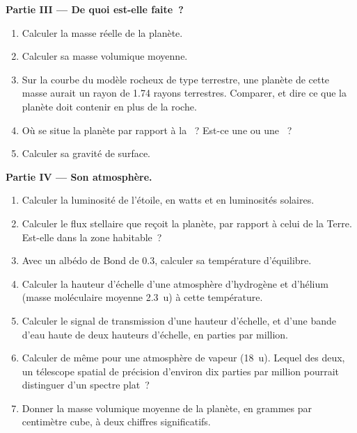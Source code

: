 \begin{problem}
\medskip\noindent\textbf{Partie III --- De quoi est-elle faite~?}
\begin{enumerate}[resume]
\item Calculer la masse réelle de la planète.
\item Calculer sa masse volumique moyenne.
\item Sur la courbe du modèle rocheux de type terrestre, une planète de cette masse
  aurait un rayon de 1.74 rayons terrestres. Comparer, et dire ce que la planète
  doit contenir en plus de la roche.
\item Où se situe la planète par rapport à la ~? Est-ce
  une  ou une ~?
\item Calculer sa gravité de surface.
\end{enumerate}

\medskip\noindent\textbf{Partie IV --- Son atmosphère.}
\begin{enumerate}[resume]
\item Calculer la luminosité de l'étoile, en watts et en luminosités
  solaires.
\item Calculer le flux stellaire que reçoit la planète, par rapport à celui
  de la Terre. Est-elle dans la zone habitable~?
\item Avec un albédo de Bond de 0.3, calculer sa température d'équilibre.
\item Calculer la hauteur d'échelle d'une atmosphère d'hydrogène et d'hélium
  (masse moléculaire moyenne \qty{2.3}{u}) à cette température.
\item Calculer le signal de transmission d'une hauteur d'échelle, et d'une
  bande d'eau haute de deux hauteurs d'échelle, en parties par million.
\item Calculer de même pour une atmosphère de vapeur (\qty{18}{u}). Lequel des deux,
  un télescope spatial de précision d'environ dix parties par
  million pourrait distinguer d'un spectre plat~?
\item Donner la masse volumique moyenne de la planète, en grammes par
  centimètre cube, à deux chiffres significatifs.
\end{enumerate}
\end{problem}
